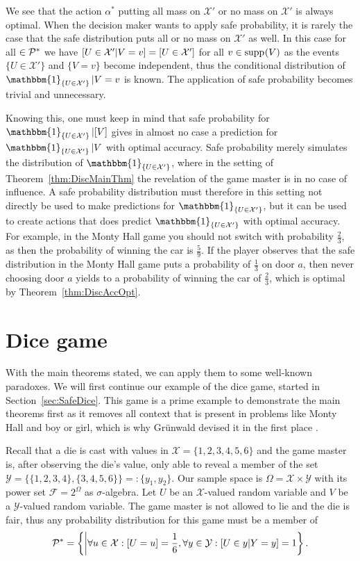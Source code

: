 \documentclass[a4paper]{report}
\theoremstyle{plain}
\theoremstyle{definition}
\theoremstyle{remark}
\numberwithin{equation}{chapter}
\let\P\relax
\DeclareMathOperator{\P}{\mathbb{P}}
\DeclareMathOperator{\1}{\mathbbm{1}}
\newcommand{\F}{\mathcal{F}}
\newcommand{\X}{\mathcal{X}}
\newcommand{\Y}{\mathcal{Y}}
\DeclareMathOperator{\supp}{supp}
\newcommand{\Pmod}{\mathcal{P}^*}
\newcommand{\GeneralGenInd}{\1_{\{U\in\X'\}}}
\begin{document}
We see that the action $\alpha^*$ putting all mass on $\X'$ or no mass on $\X'$ is always optimal. When the decision maker wants to apply safe probability, it is rarely the case that the safe distribution puts all or no mass on $\X'$ as well. In this case for all $\P\in\Pmod$ we have $\P[U\in\X'|V=v]=\P[U\in\X']$ for all $v\in\supp_{\P}(V)$ as the events $\{U\in\X'\}$ and $\{V=v\}$ become independent, thus the conditional distribution of $\GeneralGenInd|V=v$ is known. The application of safe probability becomes trivial and unnecessary.

Knowing this, one must keep in mind that safe probability for $\GeneralGenInd|[V]$ gives in almost no case a prediction for $\GeneralGenInd|V$ with optimal accuracy. Safe probability merely simulates the distribution of $\GeneralGenInd$, where in the setting of Theorem~\ref{thm:DiscMainThm} the revelation of the game master is in no case of influence. A safe probability distribution must therefore in this setting not directly be used to make predictions for $\GeneralGenInd$, but it can be used to create actions that does predict $\GeneralGenInd$ with optimal accuracy. For example, in the Monty Hall game you should not switch with probability $\frac{2}{3}$, as then the probability of winning the car is $\frac{5}{9}$. If the player observes that the safe distribution in the Monty Hall game puts a probability of $\frac{1}{3}$ on door $a$, then never choosing door $a$ yields to a probability of winning the car of $\frac{2}{3}$, which is optimal by Theorem~\ref{thm:DiscAccOpt}.

\section{Dice game}\label{sec:DiscDice}
With the main theorems stated, we can apply them to some well-known paradoxes. We will first continue our example of the dice game, started in Section~\ref{sec:SafeDice}. This game is a prime example to demonstrate the main theorems first as it removes all context that is present in problems like Monty Hall and boy or girl, which is why Grünwald devised it in the first place \cite{Grunwald13}.

Recall that a die is cast with values in $\X=\{1,2,3,4,5,6\}$ and the game master is, after observing the die's value, only able to reveal a member of the set $\Y=\{\{1,2,3,4\},\{3,4,5,6\}\}=:\{y_1,y_2\}$. Our sample space is $\Omega=\X\times\Y$ with its power set $\F=2^\Omega$ as $\sigma$-algebra. Let $U$ be an $\X$-valued random variable and $V$ be a $\Y$-valued random variable. The game master is not allowed to lie and the die is fair, thus any probability distribution for this game must be a member of \begin{equation}
\Pmod=\left\{\P\middle|\forall u\in\X:\P[U=u]=\frac{1}{6},\forall y\in\Y:\P[U\in y|Y=y]=1\right\}.
\end{equation}
\end{document}

